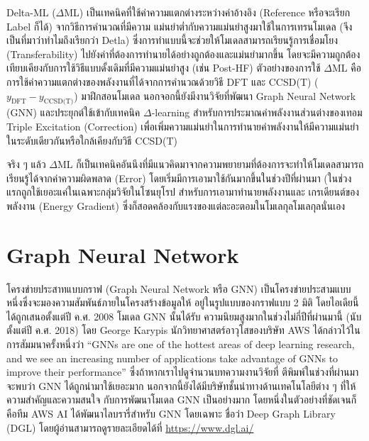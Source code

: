 Delta-ML ($\Delta$ML) เป็นเทคนิคที่ใช้ค่าความแตกต่างระหว่างค่าอ้างอิง (Reference หรือจะเรียก Label ก็ได้) จากวิธีการคำนวณที่มีความ%
แม่นยำต่ำกับความแม่นยำสูงมาใช้ในการเทรนโมเดล (จึงเป็นที่มาว่าทำไมถึงเรียกว่า Detla) ซึ่งการทำแบบนี้จะช่วยให้โมเดลสามารถเรียนรู้การเชื่อมโยง 
(Transferability) ไปยังค่าที่ต้องการทำนายได้อย่างถูกต้องและแม่นยำมากขึ้น โดยจะมีความถูกต้องเทียบเคียงกับการใช้วิธีแบบดั้งเดิมที่มีความแม่นยำสูง 
(เช่น Post-HF) ตัวอย่างของการใช้ $\Delta$ML คือการใช้ค่าความแตกต่างของพลังงานที่ได้จากการคำนวณด้วยวิธี DFT และ CCSD(T) 
($y_{\text{DFT}} - y_{\text{CCSD(T)}}$) มาฝึกสอนโมเดล\autocite{ramakrishnan2015a} นอกจอกนี้ยังมีงานวิจัยที่พัฒนา Graph 
Neural Network (GNN) และประยุกต์ใช้เข้ากับเทคนิค $\Delta$-learning สำหรับการประมาณค่าพลังงานส่วนต่างของเทอม Triple Excitation
(Correction) เพื่อเพิ่มความแม่นยำในการทำนายค่าพลังงานให้มีความแม่นยำในระดับเดียวกันหรือใกล้เคียงกับวิธี CCSD(T)\autocite{ruth2022}

จริง ๆ แล้ว $\Delta$ML ก็เป็นเทคนิคอันนึงที่มีแนวคิดมาจากความพยายามที่ต้องการจะทำให้โมเดลสามารถเรียนรู้ได้จากค่าความผิดพลาด (Error) 
โดยเริ่มมีการเอามาใช้กันมากขึ้นในช่วงปีที่ผ่านมา (ในช่วงแรกถูกใช้เยอะแค่ในเฉพาะกลุ่มวิจัยในโซนยุโรป สำหรับการเอามาทำนายพลังงานและ%
เกรเดียนต์ของพลังงาน (Energy Gradient) ซึ่งก็สอดคล้องกับแรงของแต่ละอะตอมในโมเลกุลโมเลกุลนั่นเอง

\section{Graph Neural Network}
\label{sec:gnn}

โครงข่ายประสาทแบบกราฟ (Graph Neural Network หรือ GNN) เป็นโครงข่ายประสามแบบหนึ่งซึ่งจะมองความสัมพันธ์ภายในโครงสร้างข้อมูลให้%
อยู่ในรูปแบบของกราฟแบบ 2 มิติ โดยไอเดียนี้ได้ถูกเสนอตั้งแต่ปี ค.ศ. 2008\autocite{scarselli2009,zhou2020} โมเดล GNN นั้นได้รับ%
ความนิยมสูงมากในช่วงไม่กี่ปีที่ผ่านมานี้ (นับตั้งแต่ปี ค.ศ. 2018) โดย George Karypis นักวิทยาศาสตร์อาวุโสของบริษัท AWS ได้กล่าวไว้ใน%
การสัมมนาครั้งหนึ่งว่า \enquote{GNNs are one of the hottest areas of deep learning research, and we see an increasing
number of applications take advantage of GNNs to improve their performance} ซึ่งถ้าหากเราไปดูจำนวนบทความงานวิจัยที่%
ตีพิมพ์ในช่วงที่ผ่านมาจะพบว่า GNN ได้ถูกนำมาใช้เยอะมาก นอกจากนี้ยังได้มีบริษัทชั้นนำทางด้านเทคโนโลยีต่าง ๆ ที่ให้ความสำคัญและความสนใจ%
กับการพัฒนาโมเดล GNN เป็นอย่างมาก โดยหนึ่งในตัวอย่างที่ชัดเจนก็คือทีม AWS AI ได้พัฒนาไลบรารี่สำหรับ GNN โดยเฉพาะ ชื่อว่า Deep Graph 
Library (DGL) โดยผู้อ่านสามารถดูรายละเอียดได้ที่ \url{https://www.dgl.ai/}


